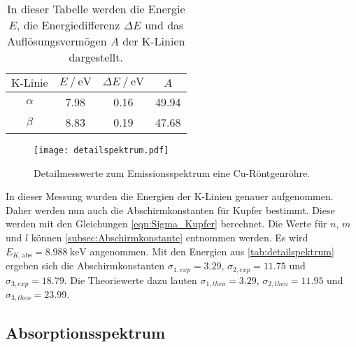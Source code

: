 \begin{table}
    \centering
    \caption{In dieser Tabelle werden die Energie $E$, die Energiedifferenz $\Delta E$ und das Auflösungsvermögen $A$ der K-Linien dargestellt.}
    \label{tab:detailspektrum}
    \begin{tabular}{c S[table-format = 1.2] S[table-format = 1.2] S[table-format = 2.2]}
      \toprule
       {$\text{K-Linie}$} & {$E \mathbin{/} \unit{\electronvolt}$} & {$\Delta E \mathbin{/} \unit{\electronvolt}$} & {$A$}\\
      \midrule
        {$\alpha$} & 7.98 & 0.16 & 49.94 \\
        {$\beta$}  & 8.83 & 0.19 & 47.68 \\
      \bottomrule
    \end{tabular}
  \end{table}

\begin{figure}
    \centering
    \texttt{[image: detailspektrum.pdf]}
    \caption{Detailmesswerte zum Emissionsspektrum eine Cu-Röntgenröhre.}
    \label{fig:detail}
\end{figure}

In dieser Messung wurden die Energien der K-Linien genauer aufgenommen. Daher werden nun auch die Abschirmkonstanten für Kupfer bestimmt. Diese werden mit den Gleichungen 
\eqref{eqn:Sigma_Kupfer} berechnet. Die Werte für $n$, $m$ und $l$ können \autoref{subsec:Abschirmkonstante} entnommen werden. Es wird $E_{K,\text{abs}} = \qty{8.988}{\kilo\electronvolt}$
angenommen. Mit den Energien aus \autoref{tab:detailspektrum} ergeben sich die Abschirmkonstanten $\sigma_{1,exp} = 3.29$, $\sigma_{2,exp} = 11.75$ und 
$\sigma_{3,exp} = 18.79$. Die Theoriewerte dazu lauten $\sigma_{1,theo} = 3.29$, $\sigma_{2,theo} = 11.95$ und 
$\sigma_{3,theo} = 23.99$.

\subsection{Absorptionsspektrum}
\label{subsec:absorption}
